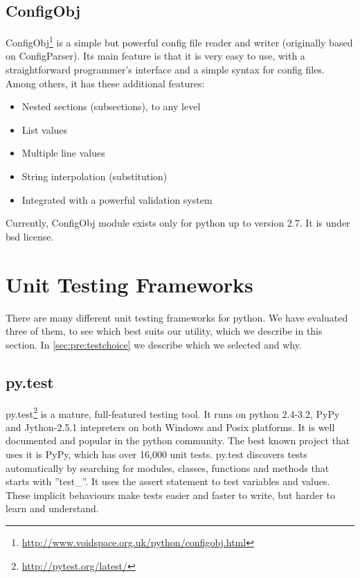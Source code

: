 \subsection{ConfigObj}
ConfigObj\footnote{\url{http://www.voidspace.org.uk/python/configobj.html}} is
a simple but powerful config file reader and writer (originally based on
ConfigParser). Its main feature is that it is very easy to use, with a
straightforward programmer's interface and a simple syntax for config files.
Among others, it has these additional features:
\begin{itemize}
	\item Nested sections (subsections), to any level
	\item List values
	\item Multiple line values
	\item String interpolation (substitution)
	\item Integrated with a powerful validation system
\end{itemize}

\noindent Currently, ConfigObj module exists only for \Gls{python} up to version
2.7. It is under \Gls{bsd} license.


\section{Unit Testing Frameworks}
\label{sec:pre:testing}
There are many different unit testing frameworks for \Gls{python}. We have evaluated
three of them, to see which best suits our \gls{utility}, which we describe in this
section. In \autoref{sec:pre:testchoice} we describe which we selected and why.

\subsection{py.test}
py.test\footnote{\url{http://pytest.org/latest/}} is a mature, full-featured testing
tool. It runs on \Gls{python} 2.4-3.2, PyPy and Jython-2.5.1 intepreters on both
Windows and Posix platforms. It is well documented and popular in the \Gls{python}
community. The best known project that uses it is PyPy, which has over 16,000
unit tests. py.test discovers tests automatically by searching for modules,
classes, functions and methods that starts with ''test\_''. It uses the assert
statement to test variables and values. These implicit behaviours make tests
easier and faster to write, but harder to learn and understand.

